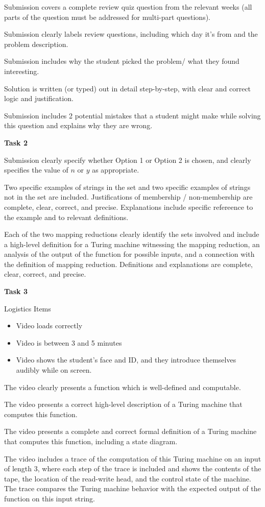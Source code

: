 Submission covers a complete review quiz question from the relevant weeks 
(all parts of the question must be addressed for multi-part questions).

Submission clearly labels review questions, including which day it's from and the problem description.

Submission includes why the student picked the problem/ what they found interesting.

Solution is written (or typed) out in detail step-by-step, with clear and correct logic and justification.

Submission includes 2 potential mistakes that a student might make while solving this question 
and explains why they are wrong.


{\bf Task 2}

Submission clearly specify whether Option 1 or Option 2 is chosen, and clearly specifies the value of $n$ or $y$ as appropriate.

Two specific examples of strings in the set and two specific examples 
of strings not in the set are included. Justifications of membership / non-membership are complete, clear, correct, and precise.
Explanations include specific refereence to the example and to relevant definitions.

Each of the two mapping reductions clearly identify the sets involved and include a high-level definition for
a Turing machine witnessing the mapping reduction, an analysis of the output of the function for possible inputs, and
a connection with the definition of mapping reduction. Definitions and explanations are complete, clear, correct, and precise.	


{\bf Task 3}

Logistics Items
\begin{itemize}
    \item Video loads correctly
    \item Video is between 3 and 5 minutes
    \item Video shows the student's face and ID, and they 
	introduce themselves audibly while on screen.
\end{itemize}

The video clearly presents a function which is well-defined and computable.

The video presents a correct high-level description of a Turing machine that computes this function.

The video presents a complete and correct formal definition of a Turing machine that computes this function,
including a state diagram.

The video includes a trace of the computation of this Turing machine on an input of length $3$, where
each step of the trace is included and shows the contents of the tape, the location of the read-write head, and 
the control state of the machine. The trace compares the Turing machine behavior with the expected output
of the function on this input string.

